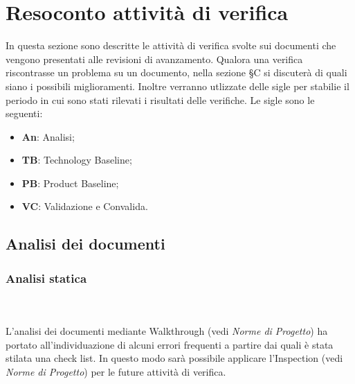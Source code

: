 \section{Resoconto attività di verifica}
In questa sezione sono descritte le attività di verifica svolte sui documenti che vengono presentati alle revisioni di avanzamento. Qualora una verifica riscontrasse un problema su un documento, nella sezione \S C si discuterà di quali siano i possibili miglioramenti.
Inoltre verranno utlizzate delle sigle per stabilie il periodo in cui sono stati rilevati i risultati delle verifiche. Le sigle sono le seguenti:
\begin{itemize}
\item \textbf{An}: Analisi;
\item \textbf{TB}: Technology Baseline;
\item \textbf{PB}: Product Baseline;
\item \textbf{VC}: Validazione e Convalida. 
\end{itemize}

\subsection{Analisi dei documenti}
\subsubsection{Analisi statica} \mbox{} \\ \mbox{} \\
L'analisi dei documenti mediante Walkthrough (vedi \textit{Norme di Progetto}) ha portato all'individuazione di alcuni errori frequenti a partire dai quali è stata stilata una check list. In questo modo sarà possibile applicare l’Inspection (vedi \textit{Norme di Progetto}) per le future attività di verifica.


